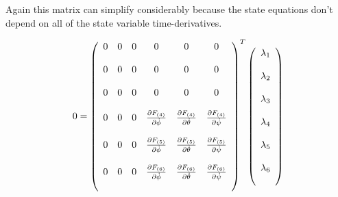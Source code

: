 Again this matrix can simplify considerably because the state equations don't depend on all of the state variable time-derivatives.

\begin{equation}
    0 = \left(
    \begin{array}{c c c c c c}
    0&0&0&0&0&0\\\\
    0&0&0&0&0&0\\\\
    0&0&0&0&0&0\\\\

    0&0&0 & \frac{\partial F_{(4)}}{\partial \dot \phi} & \frac{\partial F_{(4)}}{\partial \dot \theta} & \frac{\partial F_{(4)}}{\partial \dot \psi}\\\\

    0&0&0 & \frac{\partial F_{(5)}}{\partial \dot \phi} & \frac{\partial F_{(5)}}{\partial \dot \theta} & \frac{\partial F_{(5)}}{\partial \dot \psi}\\\\

    0&0&0 & \frac{\partial F_{(6)}}{\partial \dot \phi} & \frac{\partial F_{(6)}}{\partial \dot \theta} & \frac{\partial F_{(6)}}{\partial \dot \psi}\\\\

    \end{array}\right)^T\left(
    \begin{array}{c}
    \lambda_1\\\\
    \lambda_2\\\\
    \lambda_3\\\\
    \lambda_4\\\\
    \lambda_5\\\\
    \lambda_6\\\\
    \end{array}\right)
\end{equation}

